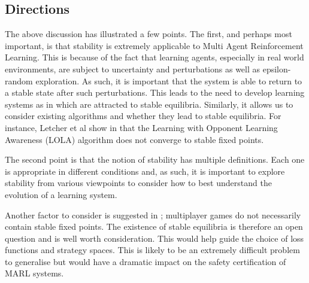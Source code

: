 \documentclass[preprint,8pt]{report}
\begin{document}
\subsection{Directions}

The above discussion has illustrated a few points. The first, and perhaps most important, is that stability is extremely applicable to Multi Agent Reinforcement Learning. This is because of the fact that learning agents, especially in real world environments, are subject to uncertainty and perturbations as well as epsilon-random exploration. As such, it is important that the system is able to return to a stable state after such perturbations. This leads to the need to develop learning systems as in \cite{Letcher2019DifferentiableMechanics} which are attracted to stable equilibria. Similarly, it allows us to consider existing algorithms and whether they lead to stable equilibria. For instance, Letcher et al show in \cite{LetcherSTABLEGAMES} that the Learning with Opponent Learning Awareness (LOLA) algorithm \cite{Foerster2018LearningAwareness} does not converge to stable fixed points.

The second point is that the notion of stability has multiple definitions. Each one is appropriate in different conditions and, as such, it is important to explore stability from various viewpoints to consider how to best understand the evolution of a learning system. 

Another factor to consider is suggested in \cite{Milchtaich2007StaticGames}; multiplayer games do not necessarily contain stable fixed points. The existence of stable equilibria is therefore an open question and is well worth consideration. This would help guide the choice of loss functions and strategy spaces. This is likely to be an extremely difficult problem to generalise but would have a dramatic impact on the safety certification of MARL systems.
\end{document}
